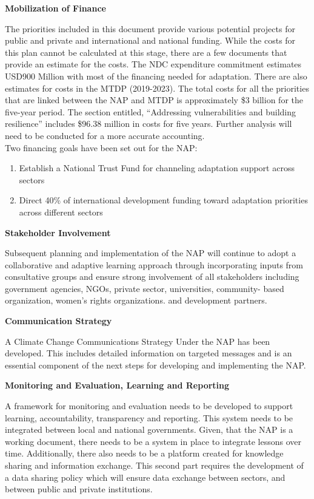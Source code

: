 \documentclass[
]{book}
\providecommand{\tightlist}{%
  \setlength{\itemsep}{0pt}\setlength{\parskip}{0pt}}
\begin{document}
\textbf{Mobilization of Finance}

The priorities included in this document provide various potential projects for public and private and international and national funding. While the costs for this plan cannot be calculated at this stage, there are a few documents that provide an estimate for the costs. The NDC expenditure commitment estimates USD900 Million with most of the financing needed for adaptation. There are also estimates for costs in the MTDP (2019-2023). The total costs for all the priorities that are linked between the NAP and MTDP is approximately \$3 billion for the five-year period. The section entitled, ``Addressing vulnerabilities and building resilience'' includes \$96.38 million in costs for five years. Further analysis will need to be conducted for a more accurate accounting.\\
Two financing goals have been set out for the NAP:

\begin{enumerate}
\def\labelenumi{\arabic{enumi}.}
\tightlist
\item
  Establish a National Trust Fund for channeling adaptation support across sectors
\item
  Direct 40\% of international development funding toward adaptation priorities across different sectors
\end{enumerate}

\textbf{Stakeholder Involvement}

Subsequent planning and implementation of the NAP will continue to adopt a collaborative and adaptive learning approach through incorporating inputs from consultative groups and ensure strong involvement of all stakeholders including government agencies, NGOs, private sector, universities, community- based organization, women's rights organizations. and development partners.

\textbf{Communication Strategy}

A Climate Change Communications Strategy Under the NAP has been developed. This includes detailed information on targeted messages and is an essential component of the next steps for developing and implementing the NAP.

\textbf{Monitoring and Evaluation, Learning and Reporting}

A framework for monitoring and evaluation needs to be developed to support learning, accountability, transparency and reporting. This system needs to be integrated between local and national governments. Given, that the NAP is a working document, there needs to be a system in place to integrate lessons over time. Additionally, there also needs to be a platform created for knowledge sharing and information exchange. This second part requires the development of a data sharing policy which will ensure data exchange between sectors, and between public and private institutions.

  
\end{document}
